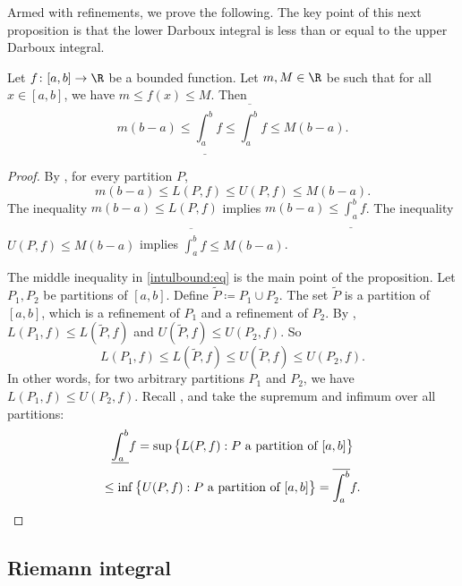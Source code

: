Armed with refinements, we prove the following.
The key point of this next proposition is that
the lower Darboux integral is less than or equal to the upper Darboux
integral.

\begin{prop} \label{intulbound:prop}
Let $f \colon [a,b] \to \R$ be a bounded function.  Let $m, M \in \R$ be 
such that for all $x \in [a,b]$, we have $m \leq f(x) \leq M$.  Then
\begin{equation}
\label{intulbound:eq}
m(b-a) \leq
\underline{\int_a^b} f \leq \overline{\int_a^b} f
\leq M(b-a) .
\end{equation}
\end{prop}

\begin{proof}
By , for every partition $P$,
\begin{equation*}
m(b-a) \leq L(P,f) \leq U(P,f) \leq M(b-a).
\end{equation*}
The inequality
$m(b-a) \leq L(P,f)$ implies $m(b-a) \leq \underline{\int_a^b} f$.
The inequality
$U(P,f) \leq M(b-a)$ implies $\overline{\int_a^b} f \leq M(b-a)$.

The middle inequality in
\eqref{intulbound:eq} is the main point of the proposition.
Let $P_1, P_2$ be partitions of $[a,b]$.  Define 
$\widetilde{P} \coloneqq P_1 \cup P_2$.
The set $\widetilde{P}$ is a partition of $[a,b]$, which
is a refinement of $P_1$ and a refinement of $P_2$.
By ,
$L(P_1,f) \leq L(\widetilde{P},f)$ and
$U(\widetilde{P},f) \leq U(P_2,f)$.  So
\begin{equation*}
L(P_1,f) \leq L(\widetilde{P},f) \leq U(\widetilde{P},f) \leq U(P_2,f) .
\end{equation*}
In other words, for two arbitrary partitions $P_1$ and $P_2$, we have
$L(P_1,f) \leq U(P_2,f)$.  
Recall , and take the supremum and
infimum over all partitions:
\begin{multline*}
\underline{\int_a^b} f = 
\sup \, \bigl\{ L(P,f) : P \text{ a partition of } [a,b] \bigr\}
\\
\leq
\inf \, \bigl\{ U(P,f) : P \text{ a partition of } [a,b] \bigr\}
=
\overline{\int_a^b} f . \qedhere
\end{multline*}
\end{proof}

\subsection{Riemann integral}

